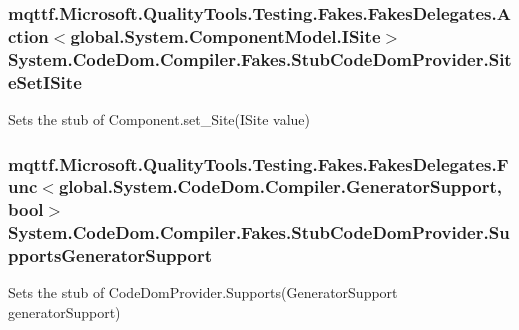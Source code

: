 \hypertarget{class_system_1_1_code_dom_1_1_compiler_1_1_fakes_1_1_stub_code_dom_provider_a58da44e7a9da39feffe02d8d9f25ec2c}{
\subsubsection[{Site\-Set\-I\-Site}]{\setlength{\rightskip}{0pt plus 5cm}mqttf.\-Microsoft.\-Quality\-Tools.\-Testing.\-Fakes.\-Fakes\-Delegates.\-Action$<$global.\-System.\-Component\-Model.\-I\-Site$>$ System.\-Code\-Dom.\-Compiler.\-Fakes.\-Stub\-Code\-Dom\-Provider.\-Site\-Set\-I\-Site}}\label{class_system_1_1_code_dom_1_1_compiler_1_1_fakes_1_1_stub_code_dom_provider_a58da44e7a9da39feffe02d8d9f25ec2c}


Sets the stub of Component.\-set\-\_\-\-Site(\-I\-Site value)

\hypertarget{class_system_1_1_code_dom_1_1_compiler_1_1_fakes_1_1_stub_code_dom_provider_af69dfff224e98f55f0968a923b91bd13}{
\subsubsection[{Supports\-Generator\-Support}]{\setlength{\rightskip}{0pt plus 5cm}mqttf.\-Microsoft.\-Quality\-Tools.\-Testing.\-Fakes.\-Fakes\-Delegates.\-Func$<$global.\-System.\-Code\-Dom.\-Compiler.\-Generator\-Support, bool$>$ System.\-Code\-Dom.\-Compiler.\-Fakes.\-Stub\-Code\-Dom\-Provider.\-Supports\-Generator\-Support}}\label{class_system_1_1_code_dom_1_1_compiler_1_1_fakes_1_1_stub_code_dom_provider_af69dfff224e98f55f0968a923b91bd13}


Sets the stub of Code\-Dom\-Provider.\-Supports(\-Generator\-Support generator\-Support)


